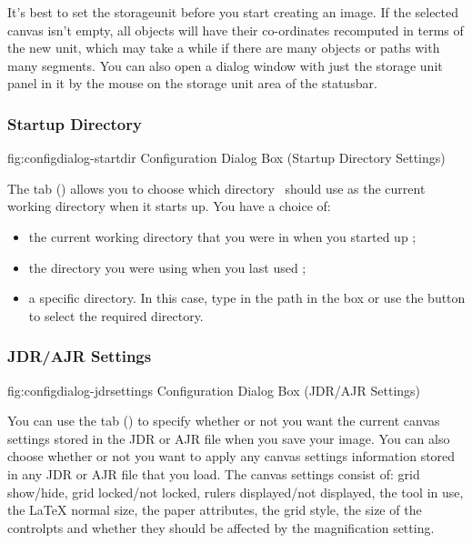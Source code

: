 It's best to set the \gls{storageunit} before you start creating an
image. If the selected \gls{canvas} isn't empty, all \glspl{object} will
have their co-ordinates recomputed in terms of the new unit, which
may take a while if there are many \glspl{object} or \glspl{path}
with many segments.  You can also open a dialog window with just the
storage unit panel in it by 
the mouse on the storage unit area of the \gls{statusbar}.


\subsubsection{Startup Directory}\label{sec:startdir}


\FloatFig
  {fig:configdialog-startdir}
  {}
  {Configuration Dialog Box (Startup Directory Settings)}

The  tab
()
allows you to choose which directory \FlowframTk\ should use as the
current working directory when it starts up. You have a choice of:
\begin{itemize}
\item the current working directory that you were in when you started
up \FlowframTk;
\item the directory you were using when you last used \FlowframTk;
\item a specific directory. In this case, type in the path in the
 box or use the
 button to select the required
directory.
\end{itemize}


\subsubsection{JDR/AJR Settings}\label{sec:jdrsettings}


\FloatFig
  {fig:configdialog-jdrsettings}
  {}
  {Configuration Dialog Box (JDR/AJR Settings)}

You can use the  tab
()
to specify whether or not you want the current
\gls{canvas} settings stored in the \gls{JDR} or \gls{AJR} file when
you save your image. You can also choose whether or not you want to
apply any canvas settings information stored in any \gls{JDR} or
\gls{AJR} file that you load. The canvas settings consist of:
grid show\slash hide, grid locked\slash not locked, rulers
displayed\slash not displayed, the tool in use, the LaTeX normal
size, the \gls{paper} attributes, the grid style, the size of the
\glspl{controlpt} and whether they should be affected by the
magnification setting.


